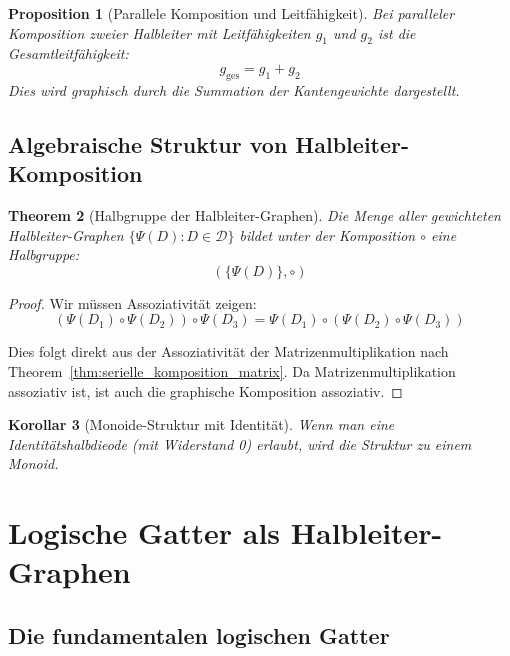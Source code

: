 \documentclass[12pt, a4paper]{article}
\newtheorem{theorem}{Theorem}[section]
\newtheorem{proposition}[theorem]{Proposition}
\newtheorem{corollary}[theorem]{Korollar}
\theoremstyle{definition}
\theoremstyle{remark}
\begin{document}
\begin{proposition}[Parallele Komposition und Leitfähigkeit]
\label{prop:parallele_komposition_leitfaehigkeit}
Bei paralleler Komposition zweier Halbleiter mit Leitfähigkeiten $g_1$ und $g_2$ ist die Gesamtleitfähigkeit:
\[
  g_{\mathrm{ges}} = g_1 + g_2
\]
Dies wird graphisch durch die Summation der Kantengewichte dargestellt.
\end{proposition}

\subsection{Algebraische Struktur von Halbleiter-Komposition}
\label{subsec:algebraische_struktur}

\begin{theorem}[Halbgruppe der Halbleiter-Graphen]
\label{thm:halbgruppe_halbleiter}
Die Menge aller gewichteten Halbleiter-Graphen $\{\Psi(D) : D \in \mathcal{D}\}$ bildet unter der Komposition $\circ$ eine Halbgruppe:
\[
  (\{\Psi(D)\}, \circ)
\]
\end{theorem}

\begin{proof}
Wir müssen Assoziativität zeigen:
\[
  (\Psi(D_1) \circ \Psi(D_2)) \circ \Psi(D_3) = \Psi(D_1) \circ (\Psi(D_2) \circ \Psi(D_3))
\]

Dies folgt direkt aus der Assoziativität der Matrizenmultiplikation nach Theorem~\ref{thm:serielle_komposition_matrix}. Da Matrizenmultiplikation assoziativ ist, ist auch die graphische Komposition assoziativ.
\end{proof}

\begin{corollary}[Monoide-Struktur mit Identität]
Wenn man eine Identitätshalbdieode (mit Widerstand 0) erlaubt, wird die Struktur zu einem Monoid.
\end{corollary}

\section{Logische Gatter als Halbleiter-Graphen}
\label{sec:schaltkreise}

\subsection{Die fundamentalen logischen Gatter}
\label{subsec:fundamentale_gatter}
\end{document}
